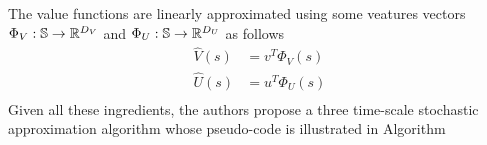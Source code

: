 The value functions are linearly approximated using some veatures vectors
$\Phi_V: \mathbb{S} \to \mathbb{R}^{D_V}$ and $\Phi_U: \mathbb{S} \to \mathbb{R}^{D_U}$ as follows
\begin{equation}
	\begin{split}
		\widehat{V}(s) &= v^T \Phi_V(s)\\
		\widehat{U}(s) &= u^T \Phi_U(s)\\
	\end{split}
\end{equation}
Given all these ingredients, the authors propose a three time-scale stochastic
approximation algorithm whose pseudo-code is illustrated in Algorithm

